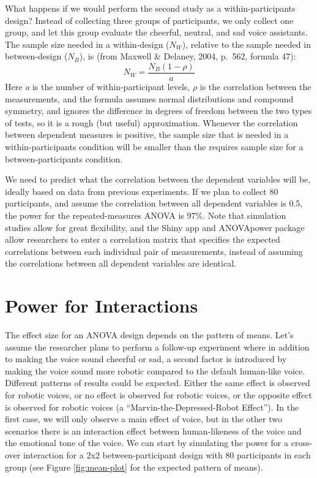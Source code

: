 \documentclass[,jou, draftfirst, a4paper,floatsintext]{apa6}
\begin{document}
What happens if we would perform the second study as a within-participants design?
Instead of collecting three groups of participants, we only collect one group, and let this group evaluate the cheerful, neutral, and sad voice assistants.
The sample size needed in a within-design (\(N_W\)), relative to the sample needed in between-design (\(N_B\)), is (from Maxwell \& Delaney, 2004, p.~562, formula 47):
\begin{equation}
N_{W}=\frac{N_{B}(1-\rho)}{a} \label{eq:within-n}
\end{equation}
Here \emph{a} is the number of within-participant levels, \(\rho\) is the correlation between the measurements, and the formula assumes normal distributions and compound symmetry, and ignores the difference in degrees of freedom between the two types of tests, so it is a rough (but useful) approximation.
Whenever the correlation between dependent measures is positive, the sample size that is needed in a within-participants condition will be smaller than the requires sample size for a between-participants condition.

We need to predict what the correlation between the dependent variables will be, ideally based on data from previous experiments.
If we plan to collect 80 participants, and assume the correlation between all dependent variables is 0.5, the power for the repeated-measures ANOVA is 97\%.
Note that simulation studies allow for great flexibility, and the Shiny app and ANOVApower package allow researchers to enter a correlation matrix that specifies the expected correlations between each individual pair of measurements, instead of assuming the correlations between all dependent variables are identical.

\hypertarget{power-for-interactions}{%
\section{Power for Interactions}\label{power-for-interactions}}

The effect size for an ANOVA design depends on the pattern of means.
Let's assume the researcher plans to perform a follow-up experiment where in addition to making the voice sound cheerful or sad, a second factor is introduced by making the voice sound more robotic compared to the default human-like voice.
Different patterns of results could be expected.
Either the same effect is observed for robotic voices, or no effect is observed for robotic voices, or the opposite effect is observed for robotic voices (a \enquote{Marvin-the-Depressed-Robot Effect}).
In the first case, we will only observe a main effect of voice, but in the other two scenarios there is an interaction effect between human-likeness of the voice and the emotional tone of the voice. We can start by simulating the power for a cross-over interaction for a 2x2 between-participant design with 80 participants in each group (see Figure \ref{fig:mean-plot} for the expected pattern of means).
\end{document}
